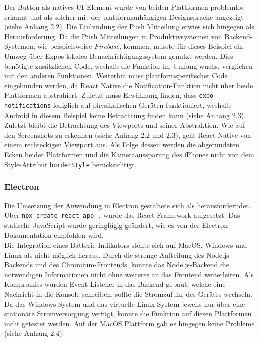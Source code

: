 \documentclass[a4paper]{scrartcl}
\begin{document}
Der Button als natives UI-Element wurde von beiden Plattformen problemlos erkannt und als solcher mit der plattformanhängigen Designsprache angezeigt (siehe Anhang 2.2). Die Einbindung der Push Mitteilung erwies sich hingegen als Herausforderung. Da die Push Mitteilungen in Produktivsystemen von Backend-Systemen, wie beispielsweise \textit{Firebase}, kommen, musste für dieses Beispiel ein Umweg über Expos lokales Benachrichtigungssystem genutzt werden. Dies benötigte zusätzlichen Code, weshalb die Funktion im Umfang wuchs, verglichen mit den anderen Funktionen. Weiterhin muss plattformspezifischer Code eingebunden werden, da React Native die Notification-Funktion nicht über beide Plattformen abstrahiert. Zuletzt muss Erwähnung finden, dass \texttt{expo-notifications} lediglich auf physikalischen Geräten funktioniert, weshalb Android in diesem Beispiel keine Betrachtung finden kann (siehe Anhang 2.3). \\

Zuletzt bleibt die Betrachtung des Viewports und seiner Abstraktion. Wie auf den Screenshots zu erkennen (siehe Anhang 2.2 und 2.3), geht React Native von einem rechteckigen Viewport aus. Als Folge dessen werden die abgerundeten Ecken beider Plattformen und die Kameraaussparung des iPhones nicht von dem Style-Attribut \texttt{borderStyle} berücksichtigt.

\subsubsection{Electron}

Die Umsetzung der Anwendung in Electron gestaltete sich als herausfordernder. Über \texttt{npx create-react-app .} wurde das React-Framework aufgesetzt. Das statische JavaScript wurde geringfügig geändert, wie es von der Electron-Dokumentation empfohlen wird. \\

Die Integration eines Batterie-Indikators stellte sich auf MacOS, Windows und Linux als nicht möglich heraus. Durch die strenge Aufteilung des Node.js-Backends und des Chromium-Frontends, konnte das Node.js-Backend die notwendigen Informationen nicht ohne weiteres an das Frontend weiterleiten. Als Kompromiss wurden Event-Listener in das Backend gebaut, welche eine Nachricht in die Konsole schreiben, sollte die Stromzufuhr des Gerätes wechseln. Da das Windows-System und das virtuelle Linux-System jeweils nur über eine stationäre Stromversorgung verfügt, konnte die Funktion auf diesen Plattformen nicht getestet werden. Auf der MacOS Plattform gab es hingegen keine Probleme (siehe Anhang 2.4). \\
\end{document}
